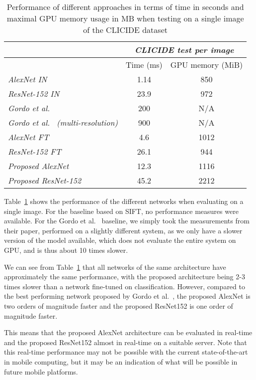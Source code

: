 \begin{table}
\begin{tabular}{|l|c|c|}
\hline & \multicolumn{2}{c|}{\emph{CLICIDE test per image}}\\
\hline & Time (ms) & GPU memory (MiB)\\
\hline \emph{AlexNet IN} & 1.14 & 850\\
\hline \emph{ResNet-152 IN} & 23.9 & 972\\
\hline \emph{Gordo et al.~\cite{gordo_deep_2016}} & 200 & N/A\\
\hline \emph{Gordo et al.~\cite{gordo_deep_2016} (multi-resolution)}
& 900 & N/A\\
\hline \emph{AlexNet FT} & 4.6 & 1012\\
\hline \emph{ResNet-152 FT} & 26.1 & 944\\
\hline \emph{Proposed AlexNet} & 12.3 & 1116\\
\hline \emph{Proposed ResNet-152} & 45.2 & 2212\\
\hline
\end{tabular}
\caption{Performance of different approaches in terms of time in seconds and
maximal GPU memory usage in MB when testing on a single image
of the CLICIDE dataset\label{tab:perftest}}
\end{table}

Table~\ref{tab:perftest} shows the performance of the different networks
when evaluating on a single image. For the baseline based on SIFT, no performance measures were available.
For the Gordo et al.~\cite{gordo_deep_2016} baseline, we simply took the
measurements from their paper, performed on a slightly different system,
as we only have a slower version of the model available, which does not
evaluate the entire system on GPU, and is thus about 10 times slower.

We can see from Table~\ref{tab:perftest} that all networks
of the same architecture have approximately the same performance, with
the proposed architecture being 2-3 times slower than a network
fine-tuned on classification. However, compared to the best performing
network proposed by Gordo et al.~\cite{gordo_deep_2016}, the proposed AlexNet
is two orders of magnitude faster and the proposed ResNet152 is one
order of magnitude faster.

This means that the proposed AlexNet architecture can be evaluated in
real-time and the proposed ResNet152 almost in real-time on a suitable
server.
Note that this real-time performance may not be possible with the current
state-of-the-art in mobile computing, but it may be an indication of
what will be possible in future mobile platforms.

